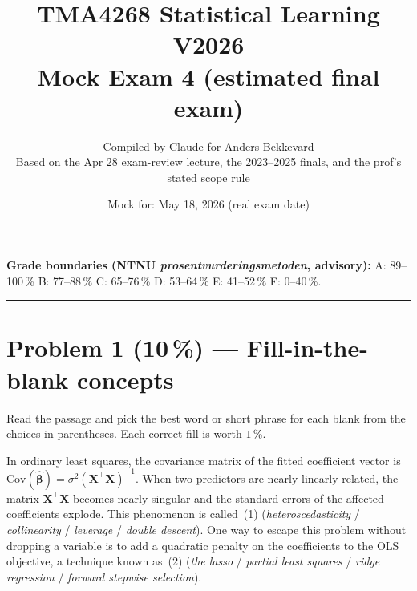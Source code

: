 \documentclass[11pt,a4paper]{article}
\title{TMA4268 Statistical Learning V2026\\[0.3em]
\large Mock Exam 4 (estimated final exam)}
\author{Compiled by Claude for Anders Bekkevard\\[0.2em]
\small Based on the Apr 28 exam-review lecture, the 2023--2025 finals, and the prof's stated scope rule}
\date{Mock for: May 18, 2026 (real exam date)}
\newcommand{\points}[1]{\textbf{(#1\,\%)}}
\begin{document}
\maketitle

\noindent{}

\vspace{0.6em}
\noindent\textbf{Grade boundaries (NTNU \emph{prosentvurderingsmetoden}, advisory):}
A: 89--100\,\% \quad B: 77--88\,\% \quad C: 65--76\,\% \quad D: 53--64\,\% \quad E: 41--52\,\% \quad F: 0--40\,\%.

\vspace{1em}
\hrule
\vspace{1em}

\section*{Problem 1 \points{10} --- Fill-in-the-blank concepts}

\noindent Read the passage and pick the best word or short phrase for each blank from the choices in parentheses. Each correct fill is worth $1$\,\%.

\bigskip

In ordinary least squares, the covariance matrix of the fitted coefficient vector is $\mathrm{Cov}(\hat{\boldsymbol\beta}) = \sigma^2 (\mathbf X^\top \mathbf X)^{-1}$. When two predictors are nearly linearly related, the matrix $\mathbf X^\top \mathbf X$ becomes nearly singular and the standard errors of the affected coefficients explode. This phenomenon is called \underline{\hspace{2.5cm}}\,(1) (\emph{heteroscedasticity} / \emph{collinearity} / \emph{leverage} / \emph{double descent}). One way to escape this problem without dropping a variable is to add a quadratic penalty on the coefficients to the OLS objective, a technique known as \underline{\hspace{2.5cm}}\,(2) (\emph{the lasso} / \emph{partial least squares} / \emph{ridge regression} / \emph{forward stepwise selection}).
\end{document}

